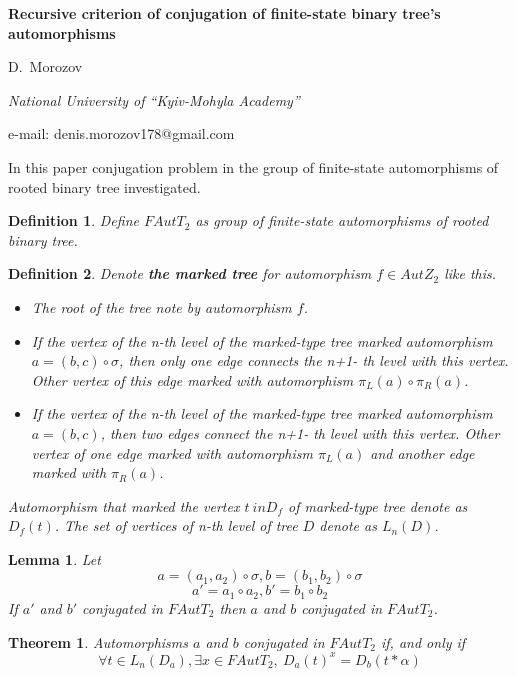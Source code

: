 \documentclass[12pt]{article}
\newtheorem{lemma}{Lemma}
\newtheorem{theorem}{Theorem}
\newtheorem{definition}{Definition}
\begin{document}
\begin{center}
{\bf\large Recursive criterion of conjugation of finite-state binary tree's automorphisms}

\vskip 0.3cm \centerline{\normalsize D.~Morozov}
\vskip 0.3cm

{\it National University of ``Kyiv-Mohyla Academy''}

e-mail: denis.morozov178@gmail.com

\end{center}
 In this paper conjugation problem in the group of finite-state automorphisms of rooted binary tree investigated.

\begin{definition}
Define $FAutT_2$ as group of finite-state automorphisms of rooted binary tree.
\end{definition}

\begin{definition}\label{marked_type_tree_def}
Denote {\bf the marked tree } for automorphism $f \in AutZ_2$  like this.

\begin{itemize}
\item The root of the tree  note by automorphism $f$.
\item If the vertex of the n-th level of the marked-type tree marked automorphism $a = (b,c)\circ\sigma$, then 
 only one edge  connects the n+1- th level with this vertex. Other vertex of this edge marked with automorphism $\pi_L(a)\circ \pi_R(a)$.
\item If the vertex of the n-th level of the marked-type tree marked automorphism $a = (b,c)$, then 
 two edges  connect the n+1- th level with this vertex. Other vertex of one edge marked with automorphism $\pi_L(a)$ and another edge marked with $\pi_R(a)$.

\end{itemize}
Automorphism that marked the vertex $ t \ in D_f $ of  marked-type tree denote as $ D_f (t) $.
The set of vertices of n-th level of tree $D$ denote as $L_n(D)$.
\end{definition}

\begin{lemma}\label{unique_solution_upper_vertex}
Let $$a = (a_1,a_2)\circ\sigma, b = (b_1,b_2)\circ\sigma$$ $$a' = a_1\circ a_2 ,b' = b_1\circ b_2 $$ 
If  $a'$ and $b'$ conjugated in $FAutT_2$
then $a$ and $b$ conjugated in $FAutT_2$.
\end{lemma}

\begin{theorem}\label{marked_trees_conj}
Automorphisms $a$ and $b$ conjugated in $FAutT_2$ if, and only if
$$\forall t\in L_n(D_a), \exists x\in FAutT_2,\ D_a(t)^x= D_b(t*\alpha) $$
\end{theorem}
\end{document}
